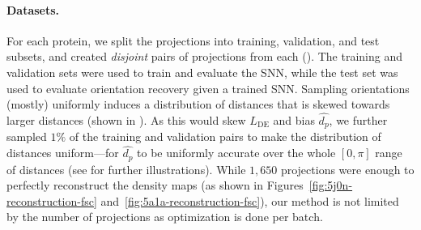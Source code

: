 \paragraph{Datasets.}
For each protein, we split the projections into training, validation, and test subsets, and created \textit{disjoint} pairs of projections from each ().
The training and validation sets were used to train and evaluate the SNN, while the test set was used to evaluate orientation recovery given a trained SNN\@.
Sampling orientations (mostly) uniformly induces a distribution of distances that is skewed towards larger distances (shown in ).
As this would skew $L_\text{DE}$ and bias $\widehat{d_p}$, we further sampled $1\%$ of the training and validation pairs to make the distribution of distances uniform---for $\widehat{d_p}$ to be uniformly accurate over the whole $[0,\pi]$ range of distances
(see  for further illustrations).
While $1,650$ projections were enough to perfectly reconstruct the density maps (as shown in Figures~\ref{fig:5j0n-reconstruction-fsc} and~\ref{fig:5a1a-reconstruction-fsc}), our method is not limited by the number of projections as optimization is done per batch.

